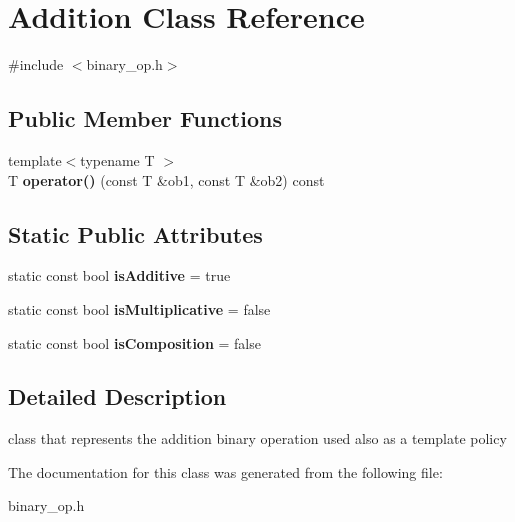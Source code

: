 \hypertarget{classAddition}{
\section{\-Addition \-Class \-Reference}
\label{classAddition}
}


{\ttfamily \#include $<$binary\-\_\-op.\-h$>$}

\subsection*{\-Public \-Member \-Functions}
\begin{DoxyCompactItemize}
\item 
\hypertarget{classAddition_a0cd0e60cd506c9e640d89422303d77b7}{
{\footnotesize template$<$typename T $>$ }\\\-T {\bfseries operator()} (const \-T \&ob1, const \-T \&ob2) const }
\label{classAddition_a0cd0e60cd506c9e640d89422303d77b7}

\end{DoxyCompactItemize}
\subsection*{\-Static \-Public \-Attributes}
\begin{DoxyCompactItemize}
\item 
\hypertarget{classAddition_a24b52cf787fbb2997cca7fabd26feb9b}{
static const bool {\bfseries is\-Additive} = true}
\label{classAddition_a24b52cf787fbb2997cca7fabd26feb9b}

\item 
\hypertarget{classAddition_a5e060aac1855b53aa87849ea9e439cd9}{
static const bool {\bfseries is\-Multiplicative} = false}
\label{classAddition_a5e060aac1855b53aa87849ea9e439cd9}

\item 
\hypertarget{classAddition_a7fce2d48cdd7335298e138775b9fde7b}{
static const bool {\bfseries is\-Composition} = false}
\label{classAddition_a7fce2d48cdd7335298e138775b9fde7b}

\end{DoxyCompactItemize}


\subsection{\-Detailed \-Description}
class that represents the addition binary operation used also as a template policy 

\-The documentation for this class was generated from the following file\-:\begin{DoxyCompactItemize}
\item 
binary\-\_\-op.\-h\end{DoxyCompactItemize}
